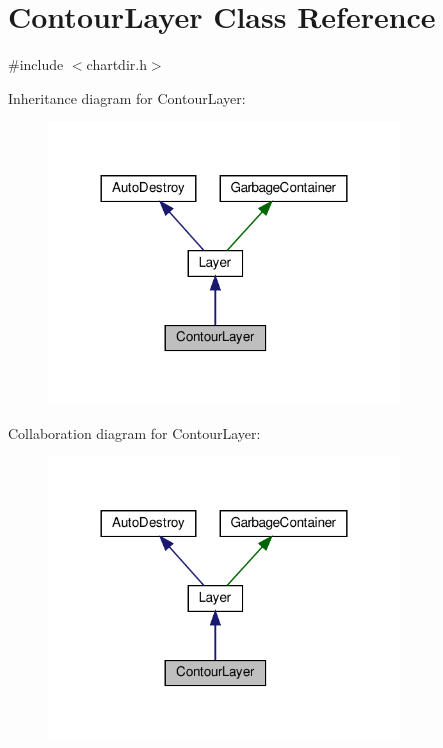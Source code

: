 \hypertarget{class_contour_layer}{}\section{Contour\+Layer Class Reference}
\label{class_contour_layer}


{\ttfamily \#include $<$chartdir.\+h$>$}



Inheritance diagram for Contour\+Layer\+:
\nopagebreak
\begin{figure}[H]
\begin{center}
\leavevmode
\includegraphics[width=264pt]{class_contour_layer__inherit__graph}
\end{center}
\end{figure}


Collaboration diagram for Contour\+Layer\+:
\nopagebreak
\begin{figure}[H]
\begin{center}
\leavevmode
\includegraphics[width=264pt]{class_contour_layer__coll__graph}
\end{center}
\end{figure}
